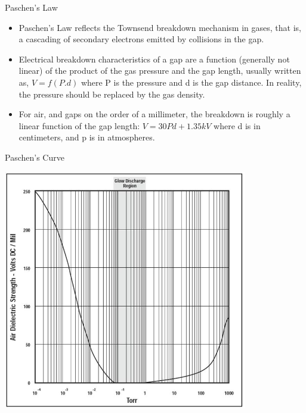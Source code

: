 \documentclass[11]{beamer}
\begin{document}
\begin{frame}{Paschen's Law}

\begin{exampleblock}

\begin{itemize}
\item Paschen's Law reflects the Townsend breakdown mechanism in gases, that is, a cascading of secondary electrons emitted by collisions in the gap.
\item Electrical breakdown characteristics of a gap are a function (generally not linear) of the product of the gas pressure and the gap length, usually written as, $ V = f(P.d) $
where P is the pressure and d is the gap distance. 
In reality, the pressure should be replaced by the gas density.
\item For air, and gaps on the order of a millimeter, the breakdown is roughly a linear function of the gap length: 
$ V = 30 P d + 1.35 kV $
where d is in centimeters, and p is in atmospheres.

\end{itemize}





\end{exampleblock}





		


\end{frame}




\begin{frame}{Paschen's Curve}
		
	\begin{center}
		\includegraphics[width=0.8\textwidth]{Dielectric_Breakdown.jpg}	
	\end{center}
	

\end{frame}
\end{document}

